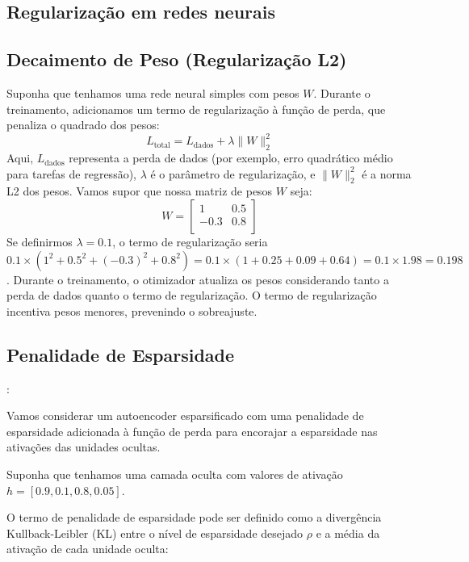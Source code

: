 \begin{apendicesenv}
	\chapter{Regularização em redes neurais}
	\label{chap:regularizacao}

	\section{Decaimento de Peso (Regularização L2)}
		\label{Apend:regularization}
		\par Suponha que tenhamos uma rede neural simples com pesos \( W \). Durante o treinamento, adicionamos um termo de regularização à função de perda, que penaliza o quadrado dos pesos:
		\begin{equation}
			L_{\text{total}} = L_{\text{dados}} + \lambda \|W\|^2_2
		\end{equation}
		Aqui, \( L_{\text{dados}} \) representa a perda de dados (por exemplo, erro quadrático médio para tarefas de regressão), \( \lambda \) é o parâmetro de regularização, e \( \|W\|^2_2 \) é a norma L2 dos pesos.
		Vamos supor que nossa matriz de pesos \( W \) seja:
		\[ W = \begin{bmatrix} 
			1 & 0.5 \\
			-0.3 & 0.8 \\
		\end{bmatrix} \]
		Se definirmos \( \lambda = 0.1 \), o termo de regularização seria \( 0.1 \times (1^2 + 0.5^2 + (-0.3)^2 + 0.8^2) = 0.1 \times (1 + 0.25 + 0.09 + 0.64) = 0.1 \times 1.98 = 0.198 \).
		Durante o treinamento, o otimizador atualiza os pesos considerando tanto a perda de dados quanto o termo de regularização. O termo de regularização incentiva pesos menores, prevenindo o sobreajuste.

	\section{Penalidade de Esparsidade}:
		\par Vamos considerar um autoencoder esparsificado com uma penalidade de esparsidade adicionada à função de perda para encorajar a esparsidade nas ativações das unidades ocultas.


		\par Suponha que tenhamos uma camada oculta com valores de ativação \( h = [0.9, 0.1, 0.8, 0.05] \).

		\par O termo de penalidade de esparsidade pode ser definido como a divergência Kullback-Leibler (KL) entre o nível de esparsidade desejado \( \rho \) e a média da ativação de cada unidade oculta:
			

\end{apendicesenv}
